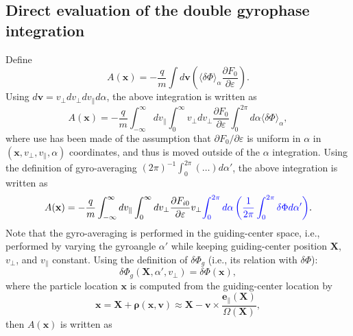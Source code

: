 \documentclass{article}
\newcommand{\tmcolor}[2]{{\color{#1}{#2}}}
\newcommand{\tmmathbf}[1]{\ensuremath{\boldsymbol{#1}}}
\begin{document}
\subsection{Direct evaluation of the double gyrophase integration}

Define
\begin{equation}
  A (\mathbf{x}) = - \frac{q}{m} \int d\mathbf{v} \left( \langle \delta \Phi
  \rangle_{\alpha} \frac{\partial F_0}{\partial \varepsilon} \right) .
\end{equation}
Using $d \mathbf{v} = v_{\perp} d v_{\perp} d v_{\parallel} d \alpha$, the
above integration is written as
\begin{equation}
  A (\mathbf{x}) = - \frac{q}{m} \int_{- \infty}^{\infty} d v_{\parallel}
  \int_0^{\infty} v_{\perp} d v_{\perp} \frac{\partial F_0}{\partial
  \varepsilon} \int_0^{2 \pi} d \alpha \langle \delta \Phi \rangle_{\alpha},
\end{equation}
where use has been made of the assumption that $\partial F_0 / \partial
\varepsilon$ is uniform in $\alpha$ in $(\mathbf{x}, v_{\perp}, v_{\parallel},
\alpha)$ coordinates, and thus is moved outside of the $\alpha$ integration.
Using the definition of gyro-averaging $(2 \pi)^{- 1} \int_0^{2 \pi} (\ldots)
d \alpha'$, the above integration is written as
\begin{equation}
  \label{21-8-22-e1} A (\mathbf{x}) = - \frac{q}{m} \int_{- \infty}^{\infty} d
  v_{\parallel} \int_0^{\infty} d v_{\perp} \frac{\partial F_{i 0}}{\partial
  \varepsilon} v_{\perp} \tmcolor{blue}{\int_0^{2 \pi} d \alpha \left(
  \frac{1}{2 \pi} \int_0^{2 \pi} \delta \Phi d \alpha' \right)} .
\end{equation}
Note that the gyro-averaging is performed in the guiding-center space, i.e.,
performed by varying the gyroangle $\alpha'$ while keeping guiding-center
position $\mathbf{X}$, $v_{\perp}$, and $v_{\parallel}$ constant. Using the
definition of $\delta \Phi_g$ (i.e., its relation with $\delta \Phi$):
\begin{equation}
  \delta \Phi_g (\mathbf{X}, \alpha', v_{\perp}) = \delta \Phi (\mathbf{x}),
\end{equation}
where the particle location $\mathbf{x}$ is computed from the guiding-center
location by
\begin{equation}
  \mathbf{x}=\mathbf{X}+\tmmathbf{\rho} (\mathbf{x}, \mathbf{v}) \approx
  \mathbf{X}-\mathbf{v} \times \frac{\mathbf{e}_{\parallel}
  (\mathbf{X})}{\Omega (\mathbf{X})},
\end{equation}
then $A (\mathbf{x})$ is written as
\end{document}
